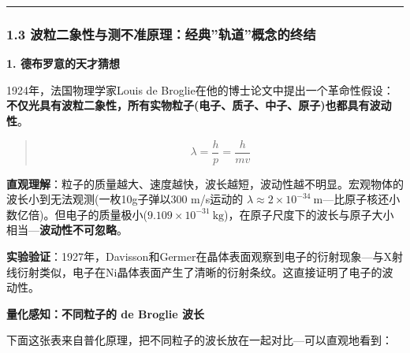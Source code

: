 \documentclass[a4paper,11pt]{ctexart}
\newcommand{\箭}{\ensuremath{\rightarrow}}
\newcommand{\左箭}{\ensuremath{\leftarrow}}
\newcommand{\上箭}{\ensuremath{\uparrow}}
\newcommand{\下箭}{\ensuremath{\downarrow}}
\newcommand{\衡}{\ensuremath{\rightleftharpoons}}
\newcommand{\双箭}{\ensuremath{\leftrightarrow}}
\newcommand{\约等于}{\ensuremath{\approx}}
\newcommand{\小于等于}{\ensuremath{\leq}}
\newcommand{\大于等于}{\ensuremath{\geq}}
\newcommand{\不等于}{\ensuremath{\neq}}
\newcommand{\西格马}{\ensuremath{\sigma}}
\newcommand{\派}{\ensuremath{\pi}}
\begin{document}
\begin{center}\rule{0.5\linewidth}{0.5pt}\end{center}

\subsubsection{1.3 波粒二象性与测不准原理：经典''轨道''概念的终结}\label{ux6ce2ux7c92ux4e8cux8c61ux6027ux4e0eux6d4bux4e0dux51c6ux539fux7406ux7ecfux5178ux8f68ux9053ux6982ux5ff5ux7684ux7ec8ux7ed3}

\textbf{1. 德布罗意的天才猜想}

1924年，法国物理学家Louis de Broglie在他的博士论文中提出一个革命性假设：\textbf{不仅光具有波粒二象性，所有实物粒子(电子、质子、中子、原子)也都具有波动性}。

\begin{quote}
\[\lambda = \frac{h}{p} = \frac{h}{mv}\]
\end{quote}

\textbf{直观理解}：粒子的质量越大、速度越快，波长越短，波动性越不明显。宏观物体的波长小到无法观测(一枚10g子弹以300 m/s运动的 \(\lambda \approx 2\times 10^{-34}\ \mathrm{m}\)---比原子核还小数亿倍)。但电子的质量极小(\(9.109\times 10^{-31}\ \mathrm{kg}\))，在原子尺度下的波长与原子大小相当---\textbf{波动性不可忽略}。

\textbf{实验验证}：1927年，Davisson和Germer在晶体表面观察到电子的衍射现象---与X射线衍射类似，电子在Ni晶体表面产生了清晰的衍射条纹。这直接证明了电子的波动性。

\textbf{量化感知：不同粒子的 de Broglie 波长}

下面这张表来自普化原理，把不同粒子的波长放在一起对比---可以直观地看到：
\end{document}
